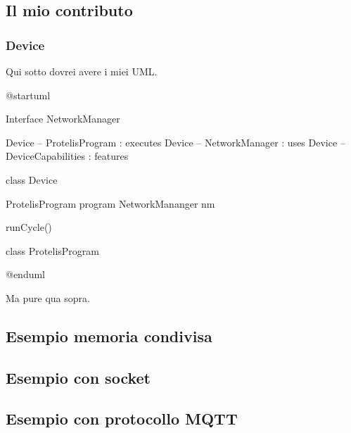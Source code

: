 \subsection{Il mio contributo}

\subsubsection{Device}

Qui sotto dovrei avere i miei UML.

\begin{center}
\begin{plantuml}
@startuml

Interface NetworkManager

Device -- ProtelisProgram : executes
Device -- NetworkManager : uses
Device -- DeviceCapabilities : features

class Device {
  ProtelisProgram program
  NetworkMananger nm

  runCycle()
}

class ProtelisProgram {

}
@enduml
\end{plantuml}

\end{center}

Ma pure qua sopra.

\subsection{Esempio memoria condivisa}

\subsection{Esempio con socket}

\subsection{Esempio con protocollo MQTT}
